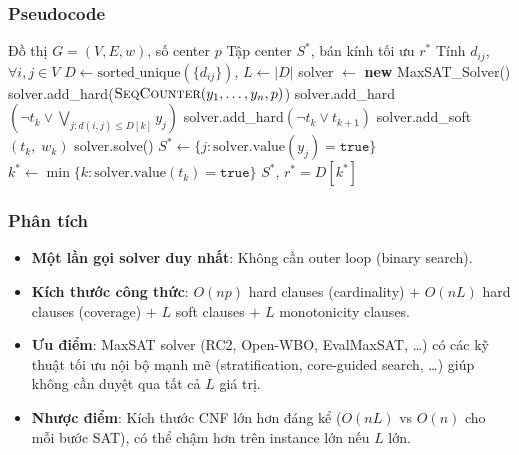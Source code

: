 \documentclass[11pt,a4paper]{article}
\begin{document}
\subsubsection{Pseudocode}

\begin{algorithm}[H]
\caption{Weighted Partial MaxSAT cho P-Center}
\label{alg:maxsat}
\begin{algorithmic}[1]
\Require Đồ thị $G=(V,E,w)$, số center $p$
\Ensure Tập center $S^*$, bán kính tối ưu $r^*$
\State Tính $d_{ij}$, $\forall i,j \in V$
\State $D \gets \text{sorted\_unique}(\{d_{ij}\})$,\; $L \gets |D|$
\State solver $\gets$ \textbf{new} MaxSAT\_Solver()
\Statex
\State {}
\State solver.add\_hard($\textsc{SeqCounter}(y_1, \dots, y_n, p)$) 
        \State solver.add\_hard$(\neg t_k \lor \bigvee_{j: d(i,j) \le D[k]} y_j)$ 
    \EndFor
\EndFor
{}
    \State solver.add\_hard$(\neg t_k \lor t_{k+1})$ 
\EndFor
\Statex
\State {}
    \State solver.add\_soft$(t_k,\; w_k)$ 
\EndFor
\Statex
\State solver.solve()
\State $S^* \gets \{j : \text{solver.value}(y_j) = \texttt{true}\}$
\State $k^* \gets \min\{k : \text{solver.value}(t_k) = \texttt{true}\}$
\State \Return $S^*$, $r^* = D[k^*]$
\end{algorithmic}
\end{algorithm}

\subsubsection{Phân tích}

\begin{itemize}[nosep]
    \item \textbf{Một lần gọi solver duy nhất}: Không cần outer loop (binary search).
    \item \textbf{Kích thước công thức}: $O(np)$ hard clauses (cardinality) $+$ $O(nL)$ hard clauses (coverage) $+$ $L$ soft clauses $+$ $L$ monotonicity clauses.
    \item \textbf{Ưu điểm}: MaxSAT solver (RC2, Open-WBO, EvalMaxSAT, \ldots) có các kỹ thuật tối ưu nội bộ mạnh mẽ (stratification, core-guided search, \ldots) giúp không cần duyệt qua tất cả $L$ giá trị.
    \item \textbf{Nhược điểm}: Kích thước CNF lớn hơn đáng kể ($O(nL)$ vs $O(n)$ cho mỗi bước SAT), có thể chậm hơn trên instance lớn nếu $L$ lớn.
\end{itemize}
\end{document}
